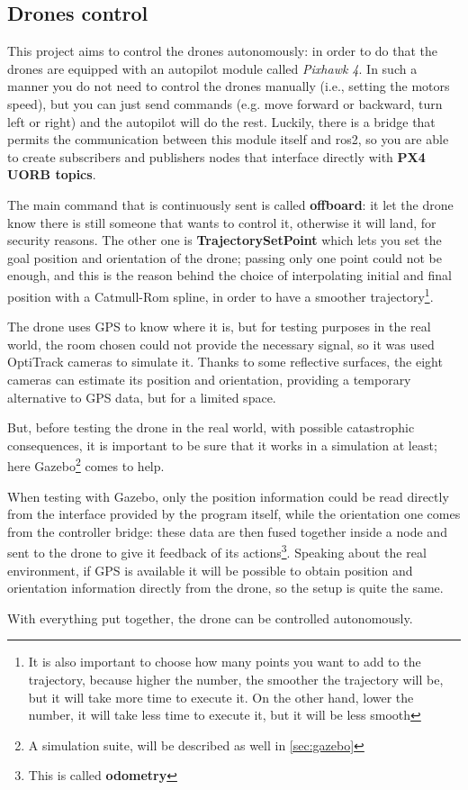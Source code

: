 \subsection{Drones control}

This project aims to control the drones autonomously: in order to do that the drones are equipped with an autopilot module called \textit{Pixhawk 4}. In such a manner you do not need to control the drones manually (i.e., setting the motors speed), but you can just send commands (e.g. move forward or backward, turn left or right) and the autopilot will do the rest. Luckily, there is a bridge that permits the communication between this module itself and \acrshort{ros}2, so you are able to create subscribers and publishers nodes that interface directly with \textbf{PX4 UORB topics}\cite{px4}.

The main command that is continuously sent is called \textbf{offboard}: it let the drone know there is still someone that wants to control it, otherwise it will land, for security reasons. The other one is \textbf{TrajectorySetPoint} which lets you set the goal position and orientation of the drone; passing only one point could not be enough, and this is the reason behind the choice of interpolating initial and final position with a Catmull-Rom spline, in order to have a smoother trajectory\footnote{It is also important to choose how many points you want to add to the trajectory, because higher the number, the smoother the trajectory will be, but it will take more time to execute it. On the other hand, lower the number, it will take less time to execute it, but it will be less smooth}.

The drone uses GPS to know where it is, but for testing purposes in the real world, the room chosen could not provide the necessary signal, so it was used OptiTrack cameras to simulate it. Thanks to some reflective surfaces, the eight cameras can estimate its position and orientation, providing a temporary alternative to GPS data, but for a limited space.

But, before testing the drone in the real world, with possible catastrophic consequences, it is important to be sure that it works in a simulation at least; here Gazebo\footnote{A simulation suite, will be described as well in \autoref{sec:gazebo}} comes to help.

When testing with Gazebo, only the position information could be read directly from the interface provided by the program itself, while the orientation one comes from the controller bridge: these data are then fused together inside a node and sent to the drone to give it feedback of its actions\footnote{This is called \textbf{odometry}}. Speaking about the real environment, if GPS is available it will be possible to obtain position and orientation information directly from the drone, so the setup is quite the same. 

With everything put together, the drone can be controlled autonomously.